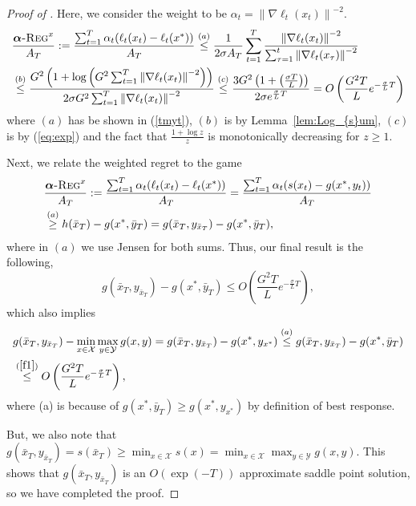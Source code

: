 \documentclass[pmlr]{jmlr} %
\def\balpha{\boldsymbol{\alpha}}
\newcommand{\norm}[1]{\left\lVert#1\right\rVert}
\newcommand{\norme}[1]{\norm{#1}}
\newcommand{\yx}[1]{y_{#1}}
\newcommand{\regret}[1]{\balpha\textsc{-Reg}^{#1}}
\newcommand{\XX}{\mathcal{X}}
\newcommand{\YY}{\mathcal{Y}}
\newcommand{\pr}[1]{\left(#1\right)}
\begin{document}
\begin{proof}[Proof of ]
Here, we consider the weight to be
$\alpha_{t} = \norme{\nabla \ell_{t}(x_{t})}^{-2}$. 
\begin{equation}
\begin{aligned}
& \frac{ \regret{x} }{  A_{T} } :=
\frac{\sum_{t=1}^{T} \alpha_{t}(\ell_{t} (x_{t}) - \ell_{t}(x^{*}))}{A_{T}} 
\overset{(a)}{\le} \frac{1}{2\sigma A_{T}} \sum_{t=1}^{T} \frac{\norme{\nabla \ell_{t}(x_{t})}^{-2}}{\sum_{\tau = 1}^{t} \norme{\nabla \ell_{t}(x_{\tau})}^{-2}}\\
&\overset{(b)}{\le} \frac{G^{2}\pr{1 + \log \pr{G^{2} \sum_{t=1}^{T} \norme{\nabla \ell_{t}(x_{t})}^{-2}}}}{2\sigma G^{2} \sum_{t=1}^{T} \norme{\nabla \ell_{t}(x_{t})}^{-2}}
\overset{(c)}{\le} \frac{3 G^{2}\pr{1 + \pr{\frac{\sigma T}{L}}}}{2 \sigma e^{\frac{\sigma}{L}T}} = O\pr{\frac{G^{2} T}{L}e^{-\frac{\sigma}{L}T}}
\end{aligned}
\end{equation}
where $(a)$ has be shown in (\ref{tmyt}), $(b)$ is by Lemma~\ref{lem:Log_{s}um}, $(c)$ is by (\ref{eq:exp}) and the fact that $\frac{1+\log z}{z}$ is monotonically decreasing for $z \ge 1$.


Next, we relate the weighted regret to the game
\begin{equation} \label{hereW}
\begin{aligned}
& \frac{ \regret{x} }{  A_{T} } :=
\frac{\sum_{t=1}^{T} \alpha_{t}(\ell_{t} (x_{t}) - \ell_{t}(x^{*}))}{A_{T}} 
= \frac{\sum_{t=1}^{T} \alpha_{t}(s(x_{t}) - g(x^{*},y_{t}))}{A_{T}} 
\\ &\overset{(a)}{\ge} h(\bar{x}_{T}) - g(x^{*},\bar{y}_{T}) = g(\bar{x}_{T},\yx{\bar{x}_{T}})  - g(x^{*},\bar{y}_{T}),
\end{aligned}
\end{equation}
where in $(a)$ we use Jensen for both sums.
Thus, our final result is the following,
\begin{equation} \label{f1}
g(\bar{x}_{T},\yx{\bar{x}_{T}})  - g(x^{*},\bar{y}_{T}) \le O\pr{\frac{G^{2} T}{L}e^{-\frac{\sigma}{L}T}},
\end{equation}
which also implies
\begin{equation}
\begin{aligned}
& g(\bar{x}_{T}, \yx{\bar{x}_{T}}) - \min_{x \in \XX} \max_{y\in \YY} g(x,y) = g(\bar{x}_{T}, \yx{\bar{x}_{T}}) - g(x^{*},\yx{x^{*}}) \overset{(a)}{\le} g(\bar{x}_{T},\yx{\bar{x}_{T}}) - g(x^{*},\bar{y}_{T}) 
\\ & \overset{(\ref{f1})}{\le} O\pr{\frac{G^{2} T}{L}e^{-\frac{\sigma}{L}T}},
\end{aligned}
\end{equation}
where (a) is because of $g(x^{*},\bar{y}_{T}) \geq g(x^{*},\yx{x^{*}})$ by definition of best response.

But, we also note that $g(\bar{x}_{T}, \yx{\bar{x}_{T}}) = s(\bar{x}_{T}) \geq  \min_{x\in \XX} s(x) = \min_{x \in \XX} \max_{y \in \YY} g(x,y)$. This shows that $g(\bar{x}_{T}, \yx{\bar{x}_{T}})$ is an $O(\exp(-T))$ approximate saddle point solution, so we have completed the proof.



\end{proof}
\end{document}
